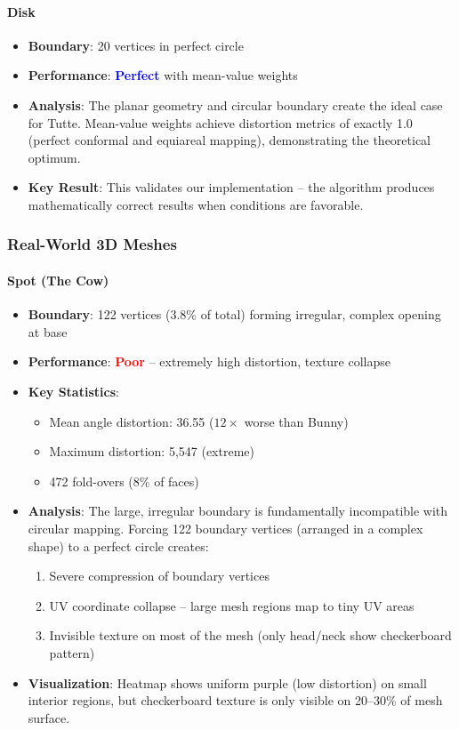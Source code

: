 \documentclass[11pt]{article}
\begin{document}
\paragraph{Disk}
\begin{itemize}
    \item \textbf{Boundary}: 20 vertices in perfect circle
    \item \textbf{Performance}: \textcolor{blue}{\textbf{Perfect}} with mean-value weights
    \item \textbf{Analysis}: The planar geometry and circular boundary create the ideal case for Tutte. Mean-value weights achieve distortion metrics of exactly 1.0 (perfect conformal and equiareal mapping), demonstrating the theoretical optimum.
    \item \textbf{Key Result}: This validates our implementation -- the algorithm produces mathematically correct results when conditions are favorable.
\end{itemize}

\subsubsection{Real-World 3D Meshes}

\paragraph{Spot (The Cow)}
\begin{itemize}
    \item \textbf{Boundary}: 122 vertices (3.8\% of total) forming irregular, complex opening at base
    \item \textbf{Performance}: \textcolor{red}{\textbf{Poor}} -- extremely high distortion, texture collapse
    \item \textbf{Key Statistics}:
    \begin{itemize}
        \item Mean angle distortion: 36.55 ($12\times$ worse than Bunny)
        \item Maximum distortion: 5,547 (extreme)
        \item 472 fold-overs (8\% of faces)
    \end{itemize}
    \item \textbf{Analysis}: The large, irregular boundary is fundamentally incompatible with circular mapping. Forcing 122 boundary vertices (arranged in a complex shape) to a perfect circle creates:
    \begin{enumerate}
        \item Severe compression of boundary vertices
        \item UV coordinate collapse -- large mesh regions map to tiny UV areas
        \item Invisible texture on most of the mesh (only head/neck show checkerboard pattern)
    \end{enumerate}
    \item \textbf{Visualization}: Heatmap shows uniform purple (low distortion) on small interior regions, but checkerboard texture is only visible on 20--30\% of mesh surface.
\end{itemize}
\end{document}
